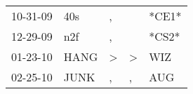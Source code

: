 \begin{supertabular}{lllll}
 10-31-09 &   40s &             , &               &  *CE1* \\
 12-29-09 &   n2f &             , &               &  *CS2* \\
 01-23-10 &  HANG &  \textgreater &  \textgreater &    WIZ \\
 02-25-10 &  JUNK &             , &             , &    AUG \\
\end{supertabular}
